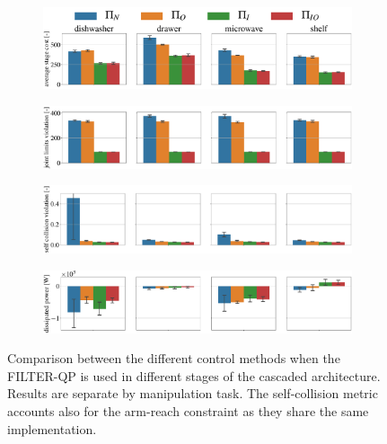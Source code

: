 \begin{figure}[t]
\centering
\hspace*{-0.2cm}
\vspace*{0.15cm}
\begin{subfigure}{1\columnwidth}
    \includegraphics[width=\linewidth]{figures/methods_comparison/average_stage_cost.pdf}
\end{subfigure}%
\hfill
\hspace*{-0.2cm}
\vspace*{0.1cm}
\begin{subfigure}{\columnwidth}
    \includegraphics[width=\linewidth]{figures/methods_comparison/joint_limits.pdf}
\end{subfigure}%
\hfill
\hspace*{-0.2cm}
\vspace*{0.1cm}
\begin{subfigure}{\columnwidth}
    \includegraphics[width=\linewidth]{figures/methods_comparison/self_collision.pdf}
\end{subfigure} \label{fig:self_collision_violation}
\hspace*{-0.2cm} 
\vspace*{0.1cm}
\begin{subfigure}{\columnwidth}
    \includegraphics[width=\linewidth]{figures/methods_comparison/dissipated_power.pdf}
\end{subfigure}
\hfill
\caption{Comparison between the different control methods when the FILTER-QP is used in different stages of the cascaded architecture. Results are separate by manipulation task. The self-collision metric accounts also for the arm-reach constraint as they share the same implementation. }\label{fig:methods_comparison}
\end{figure}

